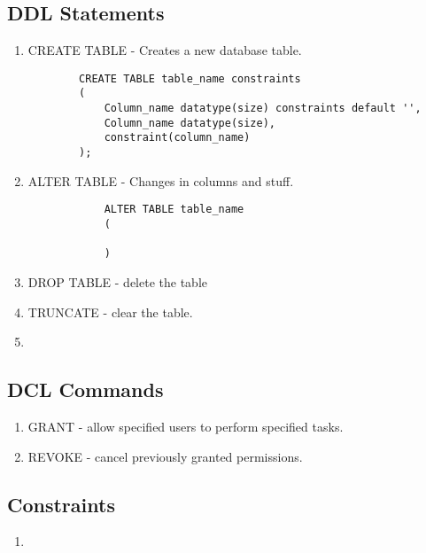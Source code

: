 \documentclass[11pt]{article}
\begin{document}
\subsection{DDL Statements}
\begin{enumerate}
	\item CREATE TABLE - Creates a new database table. 
	\begin{verbatim}
		CREATE TABLE table_name constraints
		(
			Column_name datatype(size) constraints default '',
			Column_name datatype(size),
			constraint(column_name)
		);
	\end{verbatim}
	\item ALTER TABLE - Changes in columns and stuff. 
		\begin{verbatim}
			ALTER TABLE table_name
			(
				
			)
		\end{verbatim}
	\item DROP TABLE - delete the table
	\item TRUNCATE - clear the table. 
	\item 
\end{enumerate}

\subsection{DCL Commands}
\begin{enumerate}
	\item GRANT - allow specified users to perform specified tasks. 
	\item REVOKE - cancel previously granted permissions. 
\end{enumerate}

\subsection{Constraints}
\begin{enumerate}
	\item 
\end{enumerate}

\end{document}
